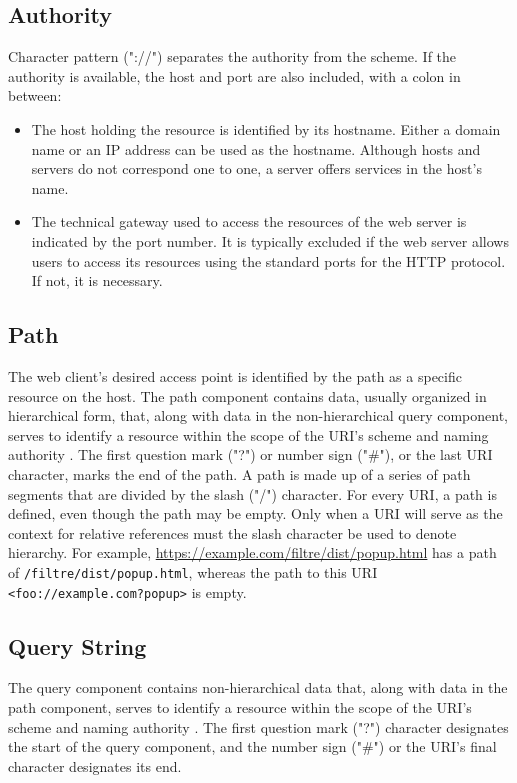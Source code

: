 \subsection*{Authority}
Character pattern ("://") separates the authority from the scheme. If the authority is available, the host and port are also included, with a colon in between:

\begin{itemize}
  \item The host holding the resource is identified by its hostname. Either a domain name or an IP address can be used as the hostname. Although hosts and servers do not correspond one to one, a server offers services in the host's name.
  \item The technical gateway used to access the resources of the web server is indicated by the port number. It is typically excluded if the web server allows users to access its resources using the standard ports for the HTTP protocol. If not, it is necessary.
\end{itemize}

\subsection*{Path}
The web client's desired access point is identified by the path as a specific resource on the host. The path component contains data, usually organized in hierarchical form, that, along with data in the non-hierarchical query component, serves to identify a resource within the scope of the URI's scheme and naming authority \autocite{berners2005uniform}. The first question mark ("?") or number sign ("\#"), or the last URI character, marks the end of the path. A path is made up of a series of path segments that are divided by the slash ("/") character. For every URI, a path is defined, even though the path may be empty. Only when a URI will serve as the context for relative references must the slash character be used to denote hierarchy. For example, \url{https://example.com/filtre/dist/popup.html} has a path of \texttt{/filtre/dist/popup.html}, whereas the path to this URI \texttt{<foo://example.com?popup>} is empty.

\subsection*{Query String}
The query component contains non-hierarchical data that, along with data in the path component, serves to identify a resource within the scope of the URI's scheme and naming authority \autocite{berners2005uniform}. The first question mark ("?") character designates the start of the query component, and the number sign ("\#") or the URI's final character designates its end.

